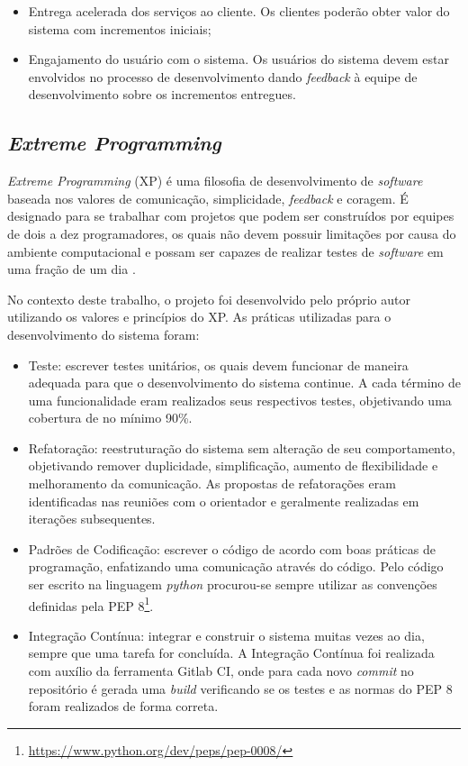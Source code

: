 \begin{itemize}
    \item Entrega acelerada dos serviços ao cliente. Os clientes poderão obter valor do sistema com incrementos iniciais;
    \item Engajamento do usuário com o sistema. Os usuários do sistema devem estar envolvidos no processo
    de desenvolvimento dando \textit{feedback} à equipe de desenvolvimento sobre os incrementos entregues.
\end{itemize}

    \subsection{\textit{Extreme Programming}}
    \textit{Extreme Programming} (XP) é uma filosofia de desenvolvimento de \textit{software} baseada nos valores de comunicação, simplicidade, \textit{feedback} e coragem. É designado para se trabalhar com projetos que podem ser
    construídos por equipes de dois a dez programadores, os quais não devem possuir limitações
    por causa do ambiente computacional e possam ser capazes de realizar testes de
    \textit{software} em uma fração de um dia \cite{beck_2004}.

    No contexto deste trabalho, o projeto foi desenvolvido pelo próprio autor utilizando os valores e princípios do XP. As práticas utilizadas para o desenvolvimento do sistema foram:

    \begin{itemize}
        \item Teste: escrever testes unitários, os quais devem funcionar de maneira adequada para que
        o desenvolvimento do sistema continue. A cada término de uma funcionalidade eram realizados
        seus respectivos testes, objetivando uma cobertura de no mínimo 90\%.
        \item Refatoração: reestruturação do sistema sem alteração de seu comportamento, objetivando
        remover duplicidade, simplificação, aumento de flexibilidade e melhoramento da comunicação. As propostas de refatorações eram identificadas nas reuniões com o orientador
        e geralmente realizadas em iterações subsequentes.
        \item Padrões de Codificação: escrever o código de acordo com boas práticas de programação, enfatizando uma comunicação através do código. Pelo código ser escrito na linguagem \textit{python}
        procurou-se sempre utilizar as convenções definidas pela PEP 8\footnote{\url{https://www.python.org/dev/peps/pep-0008/}}.
        \item Integração Contínua: integrar e construir o sistema muitas vezes ao dia, sempre que uma tarefa
        for concluída. A Integração Contínua foi realizada com auxílio da ferramenta Gitlab CI, onde para cada novo \textit{commit} no repositório é gerada uma \textit{build} verificando se os testes e as normas do PEP 8 foram realizados de forma correta.
    \end{itemize}

